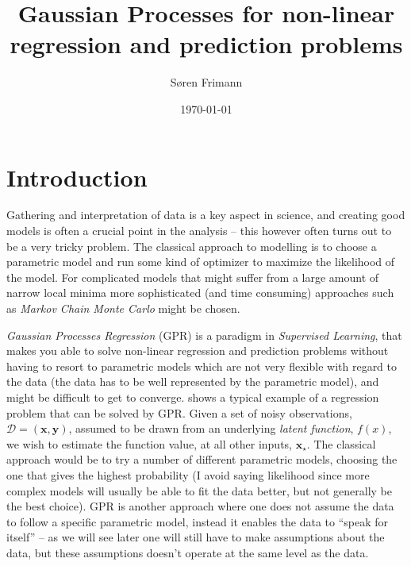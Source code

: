 \documentclass[a4paper,11pt,article,oneside]{memoir}
\begin{document}
\author{S\o ren Frimann}
\title{Gaussian Processes for non-linear regression and prediction problems}
\date{\today}
\maketitle

\chapter{Introduction}
Gathering and interpretation of data is a key aspect in science, and creating good models is often a crucial point in the analysis -- this however often turns out to be a very tricky problem. The classical approach to modelling is to choose a parametric model and run some kind of optimizer to maximize the likelihood of the model. For complicated models that might suffer from a large amount of narrow local minima more sophisticated (and time consuming) approaches such as \emph{Markov Chain Monte Carlo} might be chosen.

\emph{Gaussian Processes Regression} (GPR) is a paradigm in \emph{Supervised Learning}, that makes you able to solve non-linear regression and prediction problems without having to resort to parametric models which are not very flexible with regard to the data (the data has to be well represented by the parametric model), and might be difficult to get to converge.  shows a typical example of a regression problem that can be solved by GPR. Given a set of noisy observations, $\mathcal{D} = (\mathbf{x},\mathbf{y})$, assumed to be drawn from an underlying \emph{latent function}, $f(x)$, we wish to estimate the function value, at all other inputs, $\mathbf{x}_\star$. The classical approach would be to try a number of different parametric models, choosing the one that gives the highest probability (I avoid saying likelihood since more complex models will usually be able to fit the data better, but not generally be the best choice). GPR is another approach where one does not assume the data to follow a specific parametric model, instead it enables the data to ``speak for itself'' -- as we will see later one will still have to make assumptions about the data, but these assumptions doesn't operate at the same level as the data.
\end{document}

